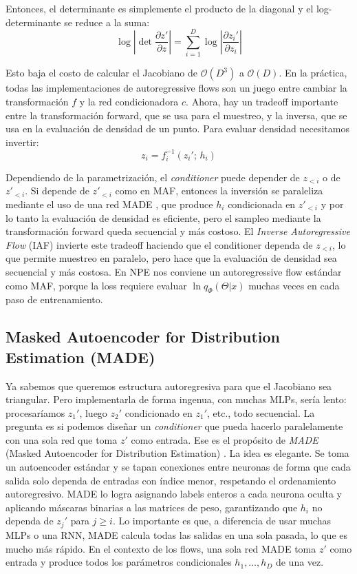 Entonces, el determinante es simplemente el producto de la diagonal y el log-determinante se reduce a la suma:
\begin{equation}
\log \left| \det \frac{\partial z'}{\partial z} \right| = \sum_{i=1}^{D} \log \left| \frac{\partial z_i'}{\partial z_i} \right|
\end{equation}

Esto baja el costo de calcular el Jacobiano de $\mathcal{O}(D^3)$ a $\mathcal{O}(D)$. En la práctica, todas las implementaciones de autoregressive flows son un juego entre cambiar la transformación $f$ y la red condicionadora $c$. Ahora, hay un tradeoff importante entre la transformación forward, que se usa para el muestreo, y la inversa, que se usa en la evaluación de densidad de un punto. Para evaluar densidad necesitamos invertir:
\begin{equation}
z_i = f_i^{-1}(z_i';\, h_i)
\end{equation}

Dependiendo de la parametrización, el \textit{conditioner} puede depender de $z_{<i}$ o de $z'_{<i}$. Si depende de $z'_{<i}$ como en MAF, entonces la inversión se paraleliza mediante el uso de una red MADE \cite{germain2015}, que produce $h_i$ condicionada en $z'_{<i}$ y por lo tanto la evaluación de densidad es eficiente, pero el sampleo mediante la transformación forward queda secuencial y más costoso. El \textit{Inverse Autoregressive Flow} (IAF) \cite{kingma2016} invierte este tradeoff haciendo que el conditioner dependa de $z_{<i}$, lo que permite muestreo en paralelo, pero hace que la evaluación de densidad sea secuencial y más costosa. En NPE nos conviene un autoregressive flow estándar como MAF, porque la loss requiere evaluar $\ln q_\Phi(\Theta|x)$ muchas veces en cada paso de entrenamiento.
 
\subsection{Masked Autoencoder for Distribution Estimation (MADE)}

Ya sabemos que queremos estructura autoregresiva para que el Jacobiano sea triangular. Pero implementarla de forma ingenua, con muchas MLPs, sería lento: procesaríamos $z_1'$, luego $z_2'$ condicionado en $z_1'$, etc., todo secuencial. La pregunta es si podemos diseñar un \textit{conditioner} que pueda hacerlo paralelamente con una sola red que toma $z'$ como entrada. Ese es el propósito de \textit{MADE} (Masked Autoencoder for Distribution Estimation) \cite{germain2015}. La idea es elegante. Se toma un autoencoder estándar y se tapan conexiones entre neuronas de forma que cada salida solo dependa de entradas con índice menor, respetando el ordenamiento autoregresivo. MADE lo logra asignando labels enteros a cada neurona oculta y aplicando máscaras binarias a las matrices de peso, garantizando que $h_i$ no dependa de $z_j'$ para $j \geq i$. Lo importante es que, a diferencia de usar muchas MLPs o una RNN, MADE calcula todas las salidas en una sola pasada, lo que es mucho más rápido. En el contexto de los flows, una sola red MADE toma $z'$ como entrada y produce todos los parámetros condicionales $h_1, \dots, h_D$ de una vez.

